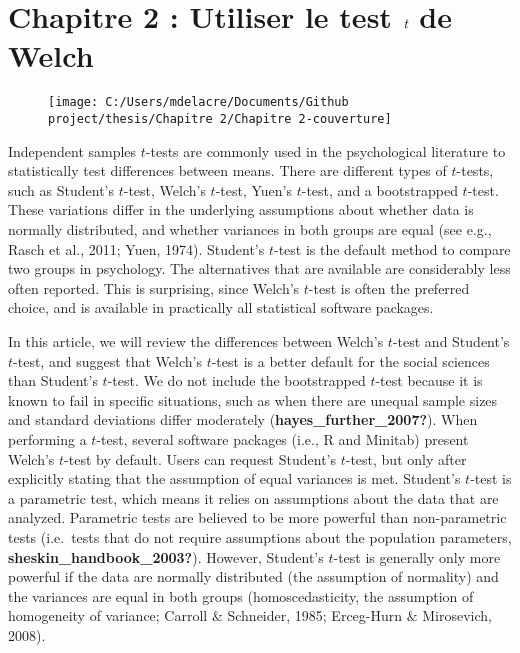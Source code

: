 \documentclass[
  english,
  man]{apa6}
\author{\phantom{0}}
\date{}
\affiliation{\phantom{0}}
\begin{document}
\hypertarget{chapitre-2-utiliser-le-test-bf-emph-t-de-welch}{%
\section{\texorpdfstring{Chapitre 2 : Utiliser le test \(\bf \emph t\) de Welch}{Chapitre 2 : Utiliser le test \textbackslash bf \textbackslash emph t de Welch}}\label{chapitre-2-utiliser-le-test-bf-emph-t-de-welch}}

\begin{figure}

{\centering \texttt{[image: C:/Users/mdelacre/Documents/Github project/thesis/Chapitre 2/Chapitre 2-couverture]} 

}

\caption{ }\label{fig:chp2p1}
\end{figure}

Independent samples \(t\)-tests are commonly used in the psychological literature to statistically test differences between means. There are different types of \(t\)-tests, such as Student's \(t\)-test, Welch's \(t\)-test, Yuen's \(t\)-test, and a bootstrapped \(t\)-test. These variations differ in the underlying assumptions about whether data is normally distributed, and whether variances in both groups are equal (see e.g., Rasch et al., 2011; Yuen, 1974). Student's \(t\)-test is the default method to compare two groups in psychology. The alternatives that are available are considerably less often reported. This is surprising, since Welch's \(t\)-test is often the preferred choice, and is available in practically all statistical software packages.

In this article, we will review the differences between Welch's \(t\)-test and Student's \(t\)-test, and suggest that Welch's \(t\)-test is a better default for the social sciences than Student's \(t\)-test. \color{red}We do not include the bootstrapped \(t\)-test because it is known to fail in specific situations, such as when there are unequal sample sizes and standard deviations differ moderately (\textbf{hayes\_further\_2007?}).
\color{black}
When performing a \(t\)-test, several software packages (i.e., R and Minitab) present Welch's \(t\)-test by default. Users can request Student's \(t\)-test, but only after explicitly stating that the assumption of equal variances is met. Student's \(t\)-test is a parametric test, which means it relies on assumptions about the data that are analyzed. Parametric tests are believed to be more powerful than non-parametric tests (i.e.~tests that do not require assumptions about the population parameters, \textbf{sheskin\_handbook\_2003?}). However, Student's \(t\)-test is generally only more powerful if the data are normally distributed (the assumption of normality) and the variances are equal in both groups (homoscedasticity, the assumption of homogeneity of variance; Carroll \(\&\) Schneider,
1985; Erceg-Hurn \(\&\) Mirosevich, 2008).
\end{document}
